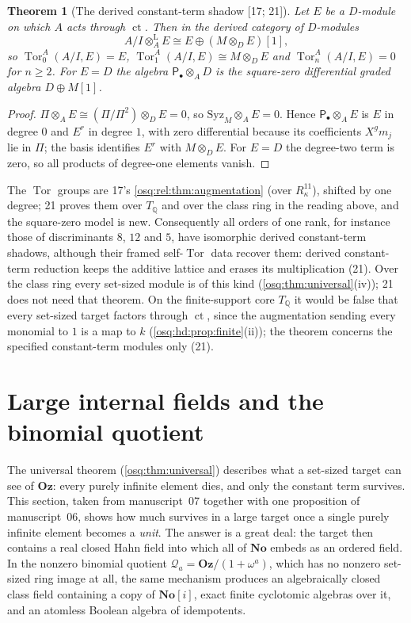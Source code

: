 \documentclass[11pt,letterpaper]{article}
\numberwithin{equation}{section}
\newtheorem{theorem}{Theorem}[section]
\theoremstyle{definition}
\theoremstyle{remark}
\theoremstyle{plain}
\newcommand{\No}{\mathbf{No}}
\newcommand{\Oz}{\mathbf{Oz}}
\newcommand{\SC}{\No[i]}
\newcommand{\Q}{\mathbb Q}
\newcommand{\Qa}{\mathcal Q}         %
\newcommand{\ct}{\operatorname{ct}}
\newcommand{\Tor}{\operatorname{Tor}}
\newcommand{\src}[1]{\textup{\textsf{[#1]}}}
\begin{document}
\begin{theorem}[The derived constant-term shadow \src{17; 21}]\label{osq:da:thm:shadow}
Let $E$ be a $D$-module on which $A$ acts through $\ct$. Then in the derived category of $D$-modules
\[
 A/I\otimes^{\mathrm L}_AE\cong E\oplus(M\otimes_DE)[1],
\]
so $\Tor^A_0(A/I,E)=E$, $\Tor^A_1(A/I,E)\cong M\otimes_DE$ and $\Tor^A_n(A/I,E)=0$ for $n\ge2$. For $E=D$ the algebra $\mathsf P_\bullet\otimes_AD$ is the
square-zero differential graded algebra $D\oplus M[1]$.
\end{theorem}
\begin{proof}
$\Pi\otimes_AE\cong(\Pi/\Pi^2)\otimes_DE=0$, so $\mathrm{Syz}_M\otimes_AE=0$. Hence $\mathsf P_\bullet\otimes_AE$ is $E$ in degree $0$ and $E^r$ in degree
$1$, with zero differential because its coefficients $X^gm_j$ lie in $\Pi$; the basis identifies $E^r$ with $M\otimes_DE$. For $E=D$ the degree-two
term is zero, so all products of degree-one elements vanish.
\end{proof}

The $\Tor$ groups are 17's \cref{osq:rel:thm:augmentation} (over $R^{11}_\kappa$), shifted by one degree; 21 proves them over $T_\Q$ and over the
class ring in the reading above, and the square-zero model is new. Consequently all orders of one rank, for instance those of discriminants
$8$, $12$ and $5$, have isomorphic derived constant-term shadows, although their framed self-$\Tor$ data recover them: derived constant-term
reduction keeps the additive lattice and erases its multiplication (21). Over the class ring every set-sized module is of this kind
(\cref{osq:thm:universal}(iv)); 21 does not need that theorem. On the finite-support core $T_\Q$ it would be false that every set-sized
target factors through $\ct$, since the augmentation sending every monomial to $1$ is a map to $k$ (\cref{osq:hd:prop:finite}(ii)); the theorem
concerns the specified constant-term modules only (21).

\section{Large internal fields and the binomial quotient}
\label{osq:sec:internal}

The universal theorem (\cref{osq:thm:universal}) describes what a set-sized target
can see of $\Oz$: every purely infinite element dies, and only the constant term
survives. This section, taken from manuscript~07 together with one proposition of
manuscript~06, shows how much survives in a large target once a single purely infinite
element becomes a \emph{unit}. The answer is a great deal: the target then contains a
real closed Hahn field into which all of $\No$ embeds as an ordered field. In the
nonzero binomial quotient $\Qa_a=\Oz/(1+\omega^a)$, which has no nonzero set-sized ring
image at all, the same mechanism produces an algebraically closed class field containing
a copy of $\SC$, exact finite cyclotomic algebras over it, and an atomless Boolean
algebra of idempotents.
\end{document}

